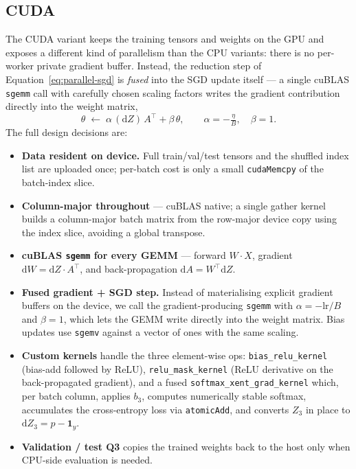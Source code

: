 \documentclass[11pt,a4paper]{article}
\begin{document}
\subsection{CUDA}\label{sec:cuda}

The CUDA variant keeps the training tensors and weights on the GPU and
exposes a different kind of parallelism than the CPU variants: there is
no per-worker private gradient buffer. Instead, the reduction step of
Equation~\eqref{eq:parallel-sgd} is \emph{fused} into the SGD update
itself --- a single cuBLAS \texttt{sgemm} call with carefully chosen
scaling factors writes the gradient contribution directly into the
weight matrix,
\begin{equation}\label{eq:cuda-reduce}
  \theta\;\leftarrow\;\alpha\,(\mathrm{d}Z)\,A^{\top}+\beta\,\theta,
  \qquad \alpha=-\tfrac{\eta}{B},\quad \beta=1.
\end{equation}
The full design decisions are:

\begin{itemize}[noitemsep,topsep=2pt]
  \item \textbf{Data resident on device.} Full train/val/test tensors and
  the shuffled index list are uploaded once; per-batch cost is only a
  small \texttt{cudaMemcpy} of the batch-index slice.
  \item \textbf{Column-major throughout} --- cuBLAS native; a single
  gather kernel builds a column-major batch matrix from the row-major
  device copy using the index slice, avoiding a global transpose.
  \item \textbf{cuBLAS \texttt{sgemm} for every GEMM} --- forward
  $W\cdot X$, gradient $\mathrm{d}W = \mathrm{d}Z\cdot A^\top$, and
  back-propagation $\mathrm{d}A = W^\top \mathrm{d}Z$.
  \item \textbf{Fused gradient + SGD step.} Instead of materialising
  explicit gradient buffers on the device, we call the
  gradient-producing \texttt{sgemm} with
  \(\alpha = -\mathrm{lr}/B\) and \(\beta=1\), which lets the GEMM write
  directly into the weight matrix. Bias updates use \texttt{sgemv}
  against a vector of ones with the same scaling.
  \item \textbf{Custom kernels} handle the three element-wise ops:
  \texttt{bias\_relu\_kernel} (bias-add followed by ReLU),
  \texttt{relu\_mask\_kernel} (ReLU derivative on the back-propagated
  gradient), and a fused \texttt{softmax\_xent\_grad\_kernel} which, per
  batch column, applies $b_3$, computes numerically stable softmax,
  accumulates the cross-entropy loss via \texttt{atomicAdd}, and
  converts $Z_3$ in place to $\mathrm{d}Z_3 = p - \mathbf{1}_y$.
  \item \textbf{Validation / test Q3} copies the trained weights back to
  the host only when CPU-side evaluation is needed.
\end{itemize}
\end{document}
